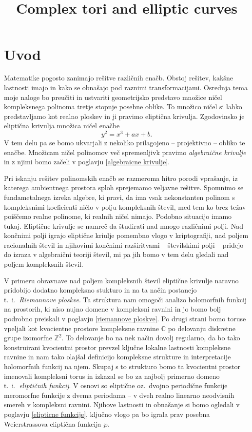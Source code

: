 \documentclass[mat1]{fmfdelo}
\title{Complex tori and elliptic curves}
\numberwithin{equation}{section}
\newcommand{\Z}{\mathbb Z}
\newcommand{\C}{\mathbb C}
\newcommand{\ti}{t.~i.\ }
\newcommand{\oz}{oz.\ }
\theoremstyle{definition}
\begin{document}


\section{Uvod}

Matematike pogosto zanimajo rešitve različnih enačb. Obstoj rešitev, kakšne lastnosti imajo in
kako se obnašajo pod raznimi transformacijami. Osrednja tema moje naloge bo preučiti in ustvariti
geometrijsko predstavo množice ničel kompleksnega polinoma tretje stopnje posebne oblike. 
To množico ničel si lahko predstavljamo kot realno ploskev in ji pravimo eliptična krivulja.   
Zgodovinsko je eliptična krivulja množica ničel enačbe
\[
    y^2 = x^3 + ax + b. 
\]
V tem delu pa se bomo ukvarjali z nekoliko prilagojeno -- projektivno -- obliko te enačbe. Množicam ničel
polinomov več spremenljivk pravimo \emph{algebraične krivulje} in z njimi bomo začeli v poglavju \ref{algebraicne krivulje}. 
\par 
Pri iskanju rešitev
polinomskih enačb se razmeroma hitro porodi vprašanje, iz katerega ambientnega prostora 
sploh sprejemamo veljavne rešitve. Spomnimo se fundametalnega izreka algebre, ki pravi, da ima
vsak nekonstanten polinom s kompleksnimi koeficienti ničlo v polju kompleksnih števil, med tem
ko brez težav poiščemo realne polinome, ki realnih ničel nimajo. Podobno situacijo imamo tukaj. 
Eliptične krivulje se namreč da študirati nad mnogo različnimi polji. Nad končnimi polji igrajo
eliptične kriulje pomembno vlogo v kriptografiji, nad poljem racionalnih števil in njihovimi končnimi razširitvami -- številskimi polji -- pridejo do izraza v algebraični teoriji
števil, mi pa jih bomo v tem delu gledali nad poljem kompleksnih števil. 
\par
V primeru obravnave nad poljem kompleksnih števil eliptične
krivulje naravno pridobijo dodatno kompleksno stukturo in na ta način postanejo \ti \emph{Riemannove ploskve}. Ta struktura nam omogoči analizo holomorfnih funkcij na prostorih, ki niso nujno domene v kompleksni ravnini in jo
bomo bolj podrobno preiskali v poglavju \ref{riemannove ploskve}.
Po drugi strani bomo toruse vpeljali kot kvocientne prostore kompleksne ravnine $\C$ po delovanju diskretne grupe izomorfne $\Z^2$. To delovanje bo na nek način dovolj regularno, da bo tako konstruirani kvocientni prostor prevzel ključne lokalne lastnosti kompleksne ravnine in nam tako olajšal definicijo kompleksne strukture in interpretacije holomorfnih funkcij na njem. Skupaj s to strukturo bomo ta kvocientni prostor imenovali kompleksni torus in izkazal se bo za najbolj primerno domeno \ti \emph{eliptičnih funkcij}. V osnovi so eliptične \oz dvojno periodične funkcije meromorfne funkcije z dvema periodama -- v dveh realno linearno neodvisnih smereh v kompleksni ravnini. Njihove lastnosti in obnašanje si bomo ogledali v poglavju \ref{elipticne funkcije}, ključno vlogo pa bo igrala prav posebna Weierstrassova eliptična funkcija $\wp$.
\end{document}
